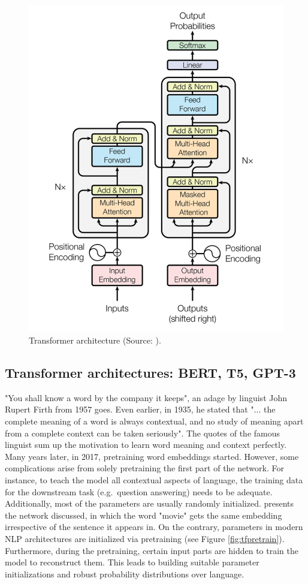 \documentclass[
]{krantz}
\begin{document}
\begin{figure}

{\centering \includegraphics[width=0.55\linewidth]{./figures/01-01-nlp/transformer_arch_vaswani} 

}

\caption{Transformer architecture (Source: \citet{Vaswani2017}).}\label{fig:tfarch}
\end{figure}



\hypertarget{transformer-architectures-bert-t5-gpt-3}{%
\subsection{Transformer architectures: BERT, T5, GPT-3}\label{transformer-architectures-bert-t5-gpt-3}}

"You shall know a word by the company it keeps", an adage by linguist
John Rupert Firth from 1957 goes. Even earlier, in 1935, he stated that
"... the complete meaning of a word is always contextual, and no study
of meaning apart from a complete context can be taken seriously". The
quotes of the famous linguist sum up the motivation to learn word
meaning and context perfectly. Many years later, in 2017, pretraining
word embeddings started. However, some complications arise from solely
pretraining the first part of the network. For instance, to teach the
model all contextual aspects of language, the training data for the
downstream task (e.g.~question answering) needs to be adequate.
Additionally, most of the parameters are usually randomly initialized.
presents the network discussed, in which the word "movie" gets the
same embedding irrespective of the sentence it appears in. On the
contrary, parameters in modern NLP architectures are initialized via
pretraining (see Figure \ref{fig:tfpretrain}). Furthermore, during the pretraining, certain input
parts are hidden to train the model to reconstruct them. This leads to
building suitable parameter initializations and robust probability
distributions over language.\\
\end{document}
